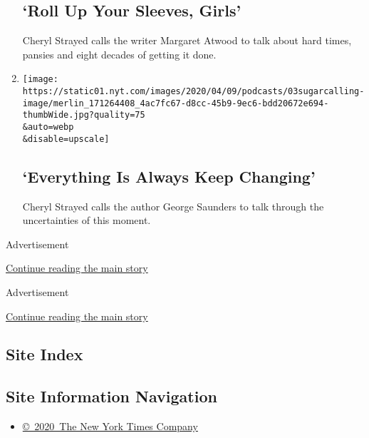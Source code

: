 \begin{enumerate}
  \hypertarget{roll-up-your-sleeves-girls}{%
  \subsection{`Roll Up Your Sleeves,
  Girls'}\label{roll-up-your-sleeves-girls}}

  Cheryl Strayed calls the writer Margaret Atwood to talk about hard
  times, pansies and eight decades of getting it done.
\item
  \href{/2020/04/03/podcasts/sugar-calling-george-saunders-coronavirus.html}{}

  \texttt{[image: https://static01.nyt.com/images/2020/04/09/podcasts/03sugarcalling-image/merlin\_171264408\_4ac7fc67-d8cc-45b9-9ec6-bdd20672e694-thumbWide.jpg?quality=75\\\&auto=webp\\\&disable=upscale]}

  \hypertarget{everything-is-always-keep-changing}{%
  \subsection{`Everything Is Always Keep
  Changing'}\label{everything-is-always-keep-changing}}

  Cheryl Strayed calls the author George Saunders to talk through the
  uncertainties of this moment.
\end{enumerate}

Advertisement

\protect\hyperlink{after-mid1}{Continue reading the main story}

Advertisement

\protect\hyperlink{after-mktg}{Continue reading the main story}

\hypertarget{site-index}{%
\subsection{Site Index}\label{site-index}}

\hypertarget{site-information-navigation}{%
\subsection{Site Information
Navigation}\label{site-information-navigation}}

\begin{itemize}
\tightlist
\item
  \href{https://help.nytimes.com/hc/en-us/articles/115014792127-Copyright-notice}{©~2020~The
  New York Times Company}
\end{itemize}

